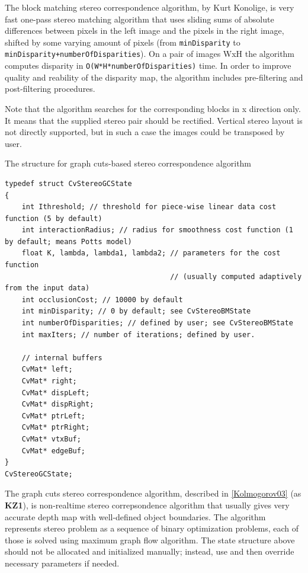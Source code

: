 The block matching stereo correspondence algorithm, by Kurt Konolige, is very fast one-pass stereo matching algorithm that uses sliding sums of absolute differences between pixels in the left image and the pixels in the right image, shifted by some varying amount of pixels (from \texttt{minDisparity} to \texttt{minDisparity+numberOfDisparities}). On a pair of images WxH the algorithm computes disparity in \texttt{O(W*H*numberOfDisparities)} time. In order to improve quality and reability of the disparity map, the algorithm includes pre-filtering and post-filtering procedures.

Note that the algorithm searches for the corresponding blocks in x direction only. It means that the supplied stereo pair should be rectified. Vertical stereo layout is not directly supported, but in such a case the images could be transposed by user.

The structure for graph cuts-based stereo correspondence algorithm

\begin{lstlisting}
typedef struct CvStereoGCState
{
    int Ithreshold; // threshold for piece-wise linear data cost function (5 by default)
    int interactionRadius; // radius for smoothness cost function (1 by default; means Potts model)
    float K, lambda, lambda1, lambda2; // parameters for the cost function
                                       // (usually computed adaptively from the input data)
    int occlusionCost; // 10000 by default
    int minDisparity; // 0 by default; see CvStereoBMState
    int numberOfDisparities; // defined by user; see CvStereoBMState
    int maxIters; // number of iterations; defined by user.

    // internal buffers
    CvMat* left;
    CvMat* right;
    CvMat* dispLeft;
    CvMat* dispRight;
    CvMat* ptrLeft;
    CvMat* ptrRight;
    CvMat* vtxBuf;
    CvMat* edgeBuf;
}
CvStereoGCState;
\end{lstlisting}

The graph cuts stereo correspondence algorithm, described in \href{\#Kolmogrov03}{[Kolmogorov03]} (as \textbf{KZ1}), is non-realtime stereo correpsondence algorithm that usually gives very accurate depth map with well-defined object boundaries. The algorithm represents stereo problem as a sequence of binary optimization problems, each of those is solved using maximum graph flow algorithm. The state structure above should not be allocated and initialized manually; instead, use  and then override necessary parameters if needed.

